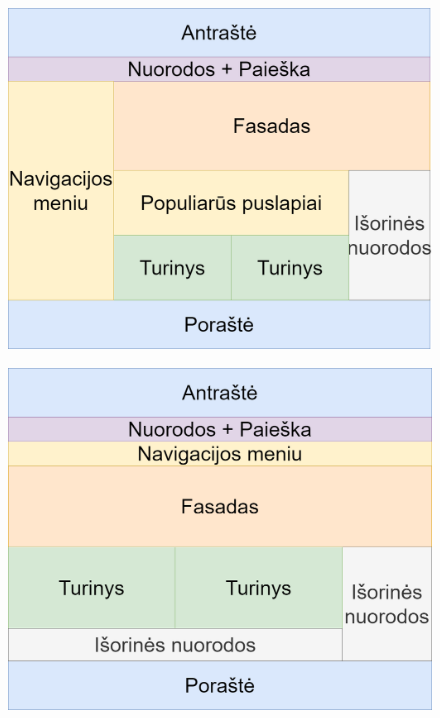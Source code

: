\documentclass{VUMIFPSkursinis}
\begin{document}
\begin{figure}[htb]
\centering
\begin{minipage}{.5\textwidth}
  \centering
  \includegraphics[width=0.9\linewidth]{img/PuslapioArchPagrindinis}
  \label{img:PuslapioArchPagrindinis}
\end{minipage}%
\begin{minipage}{.5\textwidth}
  \centering
  \includegraphics[width=0.9\linewidth]{img/PuslapioArchPagrindinisHorizontalus}
  \label{img:PuslapioArchPagrindinisHorizontalus}
\end{minipage}
\end{figure}
\end{document}
